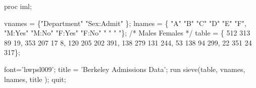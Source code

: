 \begin{listing}
proc iml;
 
   vnames = \{"Department" "Sex:Admit" \};
   lnames = \{ "A" "B" "C" "D" "E" "F",
             "M:Yes" "M:No" "F:Yes"  "F:No" " " " "\};
          /*   Males       Females  */
   table = \{ 512  313      89   19,
             353  207      17    8,
             120  205     202  391,
             138  279     131  244,
              53  138      94  299,
              22  351      24  317\};
 
   font='hwpsl009';
   title  = 'Berkeley Admissions Data';
   run sieve(table, vnames, lnames, title );
quit;
\end{listing}
